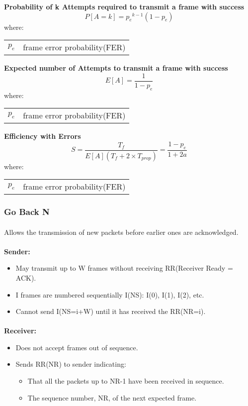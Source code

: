 \documentclass[../resumosRCOM.tex]{subfiles}
\makeatletter
\newenvironment{conditions}
  {\par\vspace{\abovedisplayskip}\noindent\begin{tabular}{>{$}l<{$} @{${}={}$} l}}
  {\end{tabular}\par\vspace{\belowdisplayskip}}
\makeatother
\begin{document}
\textbf{Probability of k Attempts required to transmit a frame with success} 
\begin{equation}
    {P[A=k]}= {p_e}^{k-1} {(1-p_e)} 
\end{equation}
where:
\begin{conditions}
    p_e & frame error probability(FER)
\end{conditions}

\textbf{Expected number of Attempts to transmit a frame with success} 
\begin{equation}
    {E[A]}= \frac{1}{1-p_e} 
\end{equation}
where:
\begin{conditions}
    p_e & frame error probability(FER)
\end{conditions}

\textbf{Efficiency with Errors} 
\begin{equation}
    {S}= \frac{T_f}{E[A](T_f + 2 \times T_{prop})} = \frac{1-p_e}{1+2a}
\end{equation}
where:
\begin{conditions}
    p_e & frame error probability(FER)
\end{conditions}



\subsubsection{Go Back N}
\paragraph{}
Allows the transmission of new packets before earlier ones are acknowledged.

\paragraph{}
\textbf{Sender:}
\begin{itemize}
    \item May transmit up to W frames without receiving RR(Receiver Ready = ACK).
    \item I frames are numbered sequentially I(NS): I(0), I(1), I(2), etc.
    \item Cannot send I(NS=i+W) until it has received the RR(NR=i).   
\end{itemize}

\paragraph{}
\textbf{Receiver:}
\begin{itemize}
    \item Does not accept frames out of sequence.
    \item Sends RR(NR) to sender indicating:
    \begin{itemize}
        \item That all the packets up to NR-1 have been received in sequence.
        \item The sequence number, NR, of the next expected frame.
    \end{itemize}
\end{itemize}
\end{document}
